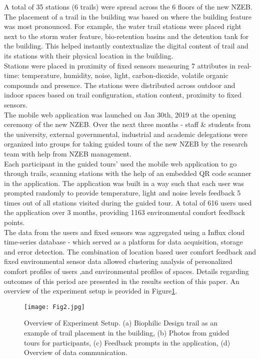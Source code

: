 
A total of 35 stations (6 trails) were spread across the 6 floors of the new NZEB. The placement of a trail in the building was based on where the building feature was most pronounced. For example, the water trail stations were placed right next to the storm water feature, bio-retention basins and the detention tank for the building. This helped instantly contextualize the digital content of trail and its stations with their physical location in the building.\\

Stations were placed in proximity of fixed sensors measuring 7 attributes in real-time: temperature, humidity, noise, light, carbon-dioxide, volatile organic compounds and presence. The stations were distributed across outdoor and indoor spaces based on trail configuration, station content, proximity to fixed sensors.\\

The mobile web application was launched on Jan 30th, 2019 at the opening ceremony of the new NZEB. Over the next three months - staff \& students from the university, external governmental, industrial and academic delegations were organized into groups for taking guided tours of the new NZEB by the research team with help from NZEB management.\\

Each participant in the guided tours' used the mobile web application to go through trails, scanning stations with the help of an embedded QR code scanner in the application. The application was built in a way such that each user was prompted randomly to provide temperature, light and noise levels feedback 5 times out of all stations visited during the guided tour. A total of 616 users used the application over 3 months, providing 1163 environmental comfort feedback points.\\

The data from the users and fixed sensors was aggregated using a Influx cloud time-series database - which served as a platform for data acquisition, storage and error detection. The combination of location based user comfort feedback and fixed environmental sensor data allowed clustering analysis of personalized comfort profiles of users ,and environmental profiles of spaces. Details regarding outcomes of this period are presented in the results section of this paper. An overview of the experiment setup is provided in Figure\ref{fig:experiments}.\\



\begin{figure}
\begin{center}
\texttt{[image: Fig2.jpg]}
\caption{Overview of Experiment Setup. (a) Biophilic Design trail as an example of trail placement in the building, (b) Photos from guided tours for participants, (c) Feedback prompts in the application, (d) Overview of data communication.}
\label{fig:experiments}
\end{center}
\end{figure}

